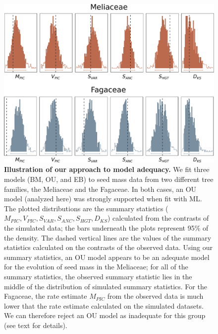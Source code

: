 \documentclass[a4paper,12pt]{article}
\begin{document}
\begin{figure}[p]
  \centering
  \includegraphics[scale=0.5]{figs/two-clade-example}
  \caption{\textbf{Illustration of our approach to model adequacy.} We fit three models (BM, OU, and EB) to seed mass data from two different tree families, the Meliaceae and the Fagaceae. In both cases, an OU model (analyzed here) was strongly supported when fit with ML. The plotted distributions are the summary statistics ($M_{PIC}, V_{PIC}, S_{VAR}, S_{ANC}, S_{HGT}, D_{KS}$) calculated from the contrasts of the simulated data; the bars underneath the plots represent 95\% of the density. The dashed vertical lines are the values of the summary statistics calculated on the contrasts of the observed data. Using our summary statistics, an OU model appears to be an adequate model for the evolution of seed mass in the Meliaceae; for all of the summary statistics, the observed summary statistic lies in the middle of the distribution of simulated summary statistics. For the Fagaceae, the rate estimate $M_{PIC}$ from the observed data is much lower that the rate estimate calculated on the simulated datasets. We can therefore reject an OU model as inadequate for this group (see text for details).}
  \label{fig:two-clades}
\end{figure}
\end{document}
